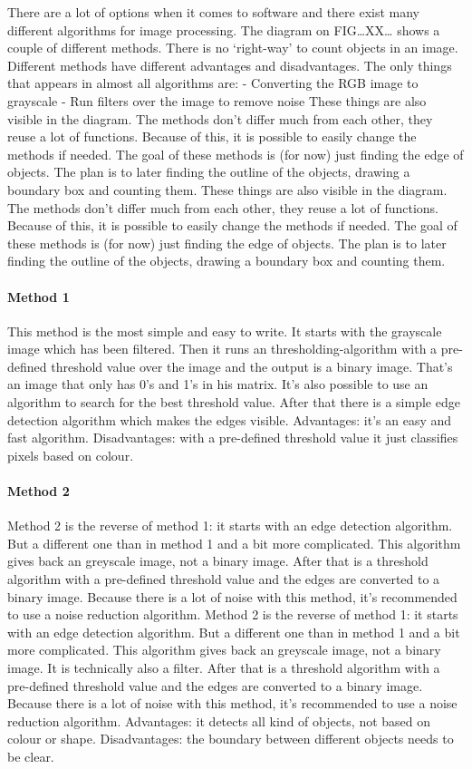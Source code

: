 \documentclass{article}
\begin{document}
There are a lot of options when it comes to software and there exist many different algorithms for image processing. The diagram on FIG…XX… shows a couple of different methods. There is no ‘right-way’ to count objects in an image. Different methods have different advantages and disadvantages. The only things that appears in almost all algorithms are:
-	Converting the RGB image to grayscale
-	Run filters over the image to remove noise
These things are also visible in the diagram. The methods don't differ much from each other, they reuse a lot of functions. Because of this, it is possible to easily change the methods if needed. The goal of these methods is (for now) just finding the edge of objects. The plan is to later finding the outline of the objects, drawing a boundary box and counting them.  
These things are also visible in the diagram. The methods don't differ much from each other, they reuse a lot of functions. Because of this, it is possible to easily change the methods if needed. The goal of these methods is (for now) just finding the edge of objects. The plan is to later finding the outline of the objects, drawing a boundary box and counting them. 

\paragraph{Method 1}
This method is the most simple and easy to write. It starts with the grayscale image which has been filtered. Then it runs an thresholding-algorithm with a pre-defined threshold value over the image and the output is a binary image. That’s an image that only has 0’s and 1’s in his matrix.  It’s also possible to use an algorithm to search for the best threshold value.  After that there is a simple edge detection algorithm which makes the edges visible. 
Advantages: it’s an easy and fast algorithm.
Disadvantages: with a pre-defined threshold value it just classifies pixels based on colour. 
\paragraph{Method 2}
Method 2 is the reverse of method 1: it starts with an edge detection algorithm. But a different one than in method 1 and a bit more complicated. This algorithm gives back an greyscale image, not a binary image. After that is a threshold algorithm with a pre-defined threshold value and the edges are converted to a binary image. Because there is a lot of noise with this method, it's recommended to use a noise reduction algorithm. 
Method 2 is the reverse of method 1: it starts with an edge detection algorithm. But a different one than in method 1 and a bit more complicated. This algorithm gives back an greyscale image, not a binary image. It is technically also a filter. After that is a threshold algorithm with a pre-defined threshold value and the edges are converted to a binary image. Because there is a lot of noise with this method, it's recommended to use a noise reduction algorithm. 
Advantages: it detects all kind of objects, not based on colour or shape.
Disadvantages: the boundary between different objects needs to be clear.
\end{document}
